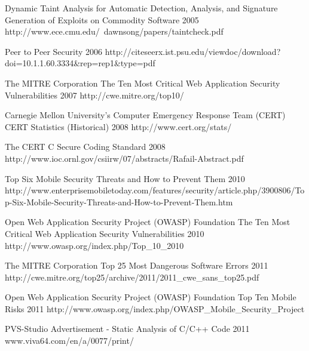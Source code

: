 \begin{thebibliography}{9}
		{
			\BibAnd
			}
		{Dynamic Taint Analysis for Automatic Detection, Analysis, and Signature Generation of Exploits on Commodity Software}	
		{2005}	
		{http://www.ece.cmu.edu/~dawnsong/papers/taintcheck.pdf}
	
		{}
		{Peer to Peer Security}	
		{2006}
		{http://citeseerx.ist.psu.edu/viewdoc/download?doi=10.1.1.60.3334\&rep=rep1\&type=pdf}

		{The MITRE Corporation}
		{The Ten Most Critical Web Application Security Vulnerabilities}
		{2007}
		{http://cwe.mitre.org/top10/}

		{Carnegie Mellon University's Computer Emergency Response Team (CERT)}
		{CERT Statistics (Historical)}
		{2008}
		{http://www.cert.org/stats/}
				
		{
			\BibAnd
			}
		{The {CERT} {C} Secure Coding Standard}
		{2008}
		{http://www.ioc.ornl.gov/csiirw/07/abstracts/Rafail-Abstract.pdf}
		
		{}
		{Top Six Mobile Security Threats and How to Prevent Them}
		{2010}
		{http://www.enterprisemobiletoday.com/features/security/article.php/3900806/Top-Six-Mobile-Security-Threats-and-How-to-Prevent-Them.htm}
		
		{Open Web Application Security Project (OWASP) Foundation}
		{The Ten Most Critical Web Application Security Vulnerabilities}
		{2010}
		{http://www.owasp.org/index.php/Top_10_2010}
	
		{The MITRE Corporation}
		{Top 25 Most Dangerous Software Errors}
		{2011}
		{http://cwe.mitre.org/top25/archive/2011/2011_cwe_sans_top25.pdf}
		
		{Open Web Application Security Project (OWASP) Foundation}
		{Top Ten Mobile Risks}
		{2011}
		{http://www.owasp.org/index.php/OWASP_Mobile_Security_Project}
		
		{
			\BibAnd
			}
		{PVS-Studio Advertisement - Static Analysis of C/C++ Code}
		{2011}
		{www.viva64.com/en/a/0077/print/}



\end{thebibliography}

